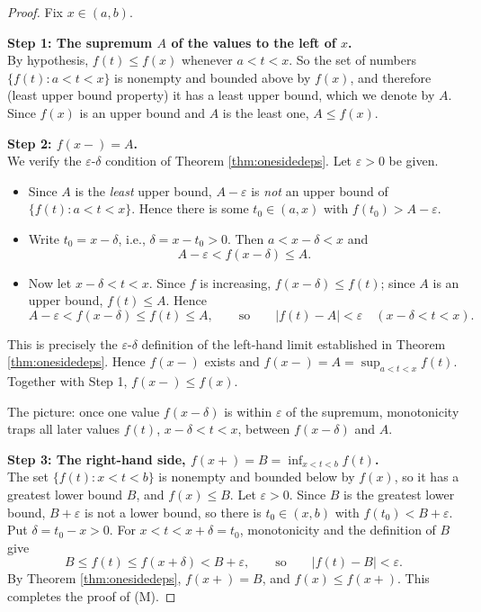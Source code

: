 \documentclass{article}
\theoremstyle{mythm}
\begin{document}
\begin{proof}
Fix $x \in (a,b)$.

\textbf{Step 1: The supremum $A$ of the values to the left of $x$.}\\
By hypothesis, $f(t) \leq f(x)$ whenever $a < t < x$. So the set of numbers $\{f(t) : a < t < x\}$ is nonempty and bounded above by $f(x)$, and therefore (least upper bound property) it has a least upper bound, which we denote by $A$. Since $f(x)$ is an upper bound and $A$ is the least one, $A \leq f(x)$.

\textbf{Step 2: $f(x-) = A$.}\\
We verify the $\varepsilon$-$\delta$ condition of Theorem \ref{thm:onesidedeps}. Let $\varepsilon > 0$ be given.
\begin{itemize}
    \item Since $A$ is the \textit{least} upper bound, $A - \varepsilon$ is \textit{not} an upper bound of $\{f(t) : a < t < x\}$. Hence there is some $t_0 \in (a,x)$ with $f(t_0) > A - \varepsilon$.
    \item Write $t_0 = x - \delta$, i.e., $\delta = x - t_0 > 0$. Then $a < x - \delta < x$ and
    \[
    A - \varepsilon < f(x - \delta) \leq A.
    \]
    \item Now let $x - \delta < t < x$. Since $f$ is increasing, $f(x - \delta) \leq f(t)$; since $A$ is an upper bound, $f(t) \leq A$. Hence
    \[
    A - \varepsilon < f(x - \delta) \leq f(t) \leq A, \qquad\text{so}\qquad |f(t) - A| < \varepsilon \quad (x - \delta < t < x).
    \]
\end{itemize}
This is precisely the $\varepsilon$-$\delta$ definition of the left-hand limit established in Theorem \ref{thm:onesidedeps}. Hence $f(x-)$ exists and $f(x-) = A = \sup_{a<t<x} f(t)$. Together with Step 1, $f(x-) \leq f(x)$.

The picture: once one value $f(x - \delta)$ is within $\varepsilon$ of the supremum, monotonicity traps all later values $f(t)$, $x - \delta < t < x$, between $f(x-\delta)$ and $A$.

\textbf{Step 3: The right-hand side, $f(x+) = B = \inf_{x<t<b} f(t)$.}\\
The set $\{f(t) : x < t < b\}$ is nonempty and bounded below by $f(x)$, so it has a greatest lower bound $B$, and $f(x) \leq B$. Let $\varepsilon > 0$. Since $B$ is the greatest lower bound, $B + \varepsilon$ is not a lower bound, so there is $t_0 \in (x,b)$ with $f(t_0) < B + \varepsilon$. Put $\delta = t_0 - x > 0$. For $x < t < x + \delta = t_0$, monotonicity and the definition of $B$ give
\[
B \leq f(t) \leq f(x + \delta) < B + \varepsilon, \qquad\text{so}\qquad |f(t) - B| < \varepsilon.
\]
By Theorem \ref{thm:onesidedeps}, $f(x+) = B$, and $f(x) \leq f(x+)$. This completes the proof of (M).


\end{proof}
\end{document}
